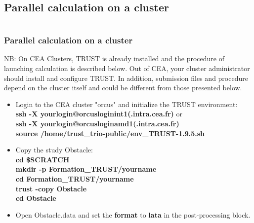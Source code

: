 \documentclass[10pt, hyperref={unicode=true,pdfusetitle, bookmarks=true,bookmarksnumbered=false,bookmarksopen=false, breaklinks=false,pdfborder={0 0l 1},backref=true,colorlinks=true,linkcolor=darkblue,pageanchor}]{beamer}
\begin{document}
\subsection{Parallel calculation on a cluster} \label{exo_para_3}
\begin{frame}
\begin{small}
\begin{columns}[c] 
\tableofcontents[sections={1-8},currentsection, currentsubsection]
\tableofcontents[sections={9-16},currentsection, currentsubsection]
\end{columns}
\end{small}
\end{frame}
\begin{frame}
\frametitle{Parallel calculation on a cluster}
\begin{block}{}
NB: On CEA Clusters, TRUST is already installed and the procedure of launching calculation is described below. Out of CEA, your cluster administrator should install and configure TRUST. In addition, submission files and procedure depend on the cluster itself and could be different from those presented below.
\begin{itemize}
\item Login to the CEA cluster "orcus" and initialize the TRUST environment: \\
{\small{
\textbf{ssh -X yourlogin@orcusloginint1(.intra.cea.fr)} or\\
\textbf{ssh -X yourlogin@orcusloginamd1(.intra.cea.fr)} \\
\textbf{source /home/trust\_trio-public/env\_TRUST-1.9.5.sh}\\
}}

\item Copy the study Obstacle:\\
\textbf{cd \$SCRATCH}\\
\textbf{mkdir  -p  Formation\_TRUST/yourname} \\
\textbf{cd Formation\_TRUST/yourname} \\
\textbf{trust -copy Obstacle} \\
\textbf{cd Obstacle} \\

\item Open Obstacle.data and set the \textbf{format} to \textbf{lata} in the post-processing block.

\end{itemize}

\end{block}
\end{frame}
\end{document}
